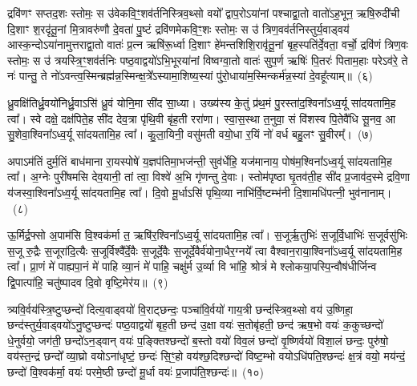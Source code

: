 द्रवि॑णꣳ सप्तद॒शः स्तोमः॒ स उ॑वेकवि॒ꣳ॒शव॑र्तनिस्त्रिव॒थ्सो वयो᳚ द्वाप॒रो\-ऽया॑नां पश्चाद्वा॒तो वातो॑\-ऽह॒भून॒ ऋषि॒रुदी॑ची दि॒शाꣳ श॒रदृ॑तू॒नां मि॒त्रावरु॑णौ दे॒वता॑ पु॒ष्टं द्रवि॑णमेकवि॒ꣳ॒शः स्तोमः॒ स उ॑ त्रिण॒वव॑र्तनिस्तुर्य॒वाड्वय॑ आस्क॒न्दो\-ऽया॑नामुत्तराद्वा॒तो वातः॑ प्र॒त्न ऋषि॑रू॒र्ध्वा दि॒शाꣳ हे॑मन्तशिशि॒रावृ॑तू॒नां बृह॒स्पति॑र्दे॒वता॒ वर्चो॒ द्रवि॑णं त्रिण॒वः स्तोमः॒ स उ॑ त्रयस्त्रि॒ꣳ॒शव॑र्तनिः पष्ठ॒वाद्वयो॑\-ऽभि॒भूरया॑नां विष्वग्वा॒तो वातः॑ सुप॒र्ण ऋषिः॑ पि॒तरः॑ पिताम॒हाः परे\-ऽव॑रे॒ ते नः॑ पान्तु॒ ते नो॑\-ऽवन्त्व॒स्मिन्ब्रह्म॑न्न॒स्मिन्क्ष॒त्रे᳚\-ऽस्यामा॒शिष्य॒स्यां पु॑रो॒धाया॑म॒स्मिन्कर्म॑न्न॒स्यां दे॒वहू᳚त्याम्॥~(६)\ip

{\anuvakamend[{विट्प॑ष्ठ॒वाड्वयो॒\-ऽष्टाविꣳ॑शतिश्च}]}

ध्रु॒वक्षि॑तिर्ध्रु॒वयो॑निर्ध्रु॒वाऽसि॑ ध्रु॒वं योनि॒मा सी॑द सा॒ध्या। उख्य॑स्य के॒तुं प्र॑थ॒मं पु॒रस्ता॑द॒श्विना᳚\-ऽ\-ध्व॒र्यू सा॑दयतामि॒ह त्वा᳚। स्वे दक्षे॒ दक्ष॑पिते॒ह सी॑द देव॒त्रा पृ॑थि॒वी बृ॑ह॒ती ररा॑णा। स्वा॒स॒स्था त॒नुवा॒ सं वि॑शस्व पि॒तेवै॑धि सू॒नव॒ आ सु॒शेवा॒श्विना᳚\-ऽ\-ध्व॒र्यू सा॑दयतामि॒ह त्वा᳚। कु॒ला॒यिनी॒ वसु॑मती वयो॒धा र॒यिं नो॑ वर्ध बहु॒लꣳ सु॒वीरम्᳚।~(७)\ip

अपाऽम॑तिं दुर्म॒तिं बाध॑माना रा॒यस्पोषे॑ य॒ज्ञप॑तिमा॒भज॑न्ती॒ सुव॑र्धेहि॒ यज॑मानाय॒ पोष॑म॒श्विना᳚\-ऽ\-ध्व॒र्यू सा॑दयतामि॒ह त्वा᳚। अ॒ग्नेः पुरी॑षमसि देव॒यानी॒ तां त्वा॒ विश्वे॑ अ॒भि गृ॑णन्तु दे॒वाः। स्तोम॑पृष्ठा घृ॒तव॑ती॒ह सी॑द प्र॒जाव॑द॒स्मे द्रवि॒णा य॑जस्वा॒श्विना᳚\-ऽ\-ध्व॒र्यू सा॑दयतामि॒ह त्वा᳚। दि॒वो मू॒र्धाऽसि॑ पृथि॒व्या नाभि॑र्वि॒ष्टम्भ॑नी दि॒शामधि॑पत्नी॒ भुव॑नानाम्।~(८)\ip

ऊ॒र्मिर्द्र॒फ्सो अ॒पाम॑सि वि॒श्वक॑र्मा त॒ ऋषि॑र॒श्विना᳚\-ऽ\-ध्व॒र्यू सा॑दयता\-मि॒ह त्वा᳚। स॒जूर्\mbox{}ऋ॒तुभिः॑ स॒जूर्वि॒धाभिः॑ स॒जूर्वसु॑भिः स॒जू रु॒द्रैः स॒जूरा॑दि॒त्यैः स॒जूर्विश्वै᳚र्दे॒वैः स॒जूर्दे॒वैः स॒जूर्दे॒वैर्व॑योना॒धैर॒ग्नये᳚ त्वा वैश्वान॒राया॒श्विना᳚\-ऽ\-ध्व॒र्यू सा॑दयतामि॒ह त्वा᳚। प्रा॒णं मे॑ पाह्यपा॒नं मे॑ पाहि व्या॒नं मे॑ पाहि॒ चक्षु॑र्म उ॒र्व्या वि भा॑हि॒ श्रोत्रं॑ मे श्लोकया॒पस्पि॒न्वौष॑धीर्जिन्व द्वि॒पात्पा॑हि॒ चतु॑ष्पादव दि॒वो वृष्टि॒मेर॑य॥~(९)\ip

{\anuvakamend[{सु॒वीरं॒ भुव॑नानामु॒र्व्या स॒प्तद॑श च}]}

त्र्यवि॒र्वय॑स्त्रि॒ष्टुप्छन्दो॑ दित्य॒वाड्वयो॑ वि॒राट्छन्दः॒ पञ्चा॑वि॒र्वयो॑ गाय॒त्री छन्द॑स्त्रिव॒थ्सो वय॑ उ॒ष्णिहा॒ छन्द॑स्तुर्य॒वाड्वयो॑\-ऽ\-नु॒ष्टुप्छन्दः॑ पष्ठ॒वाद्वयो॑ बृह॒ती छन्द॑ उ॒क्षा वयः॑ स॒तोबृ॑हती॒ छन्द॑ ऋष॒भो वयः॑ क॒कुच्छन्दो॑ धे॒नुर्वयो॒ जग॑ती॒ छन्दो॑\-ऽ\-न॒ड्वान् वयः॑ प॒ङ्क्तिश्छन्दो॑ ब॒स्तो वयो॑ विव॒लं छन्दो॑ वृ॒ष्णिर्वयो॑ विशा॒लं छन्दः॒ पुरु॑षो॒ वय॑स्त॒न्द्रं छन्दो᳚ व्या॒घ्रो वयो\-ऽ\-ना॑धृष्टं॒ छन्दः॑ सि॒ꣳ॒हो वय॑श्छ॒दिश्छन्दो॑ विष्ट॒म्भो वयो\-ऽधि॑\-पति॒श्छन्दः॑ क्ष॒त्रं वयो॒ मय॑न्दं॒ छन्दो॑ वि॒श्वक॑र्मा॒ वयः॑ परमे॒ष्ठी छन्दो॑ मू॒र्धा वयः॑ प्र॒जा\-प॑ति॒श्छन्दः॑॥~(१०)\ip


